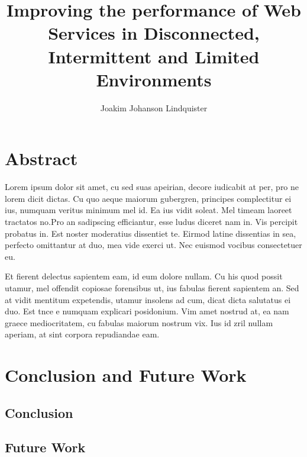\documentclass[USenglish]{ifimaster}
\title{Improving the performance of Web Services in Disconnected, Intermittent
and Limited Environments}
\author{Joakim Johanson Lindquister}
\begin{document}
\ififorside{}

\chapter*{Abstract}

Lorem ipsum dolor sit amet, cu sed suas apeirian, decore iudicabit at per, pro
ne lorem dicit dictas. Cu quo aeque maiorum gubergren, principes complectitur ei
ius, numquam veritus minimum mel id. Ea ius vidit soleat. Mel timeam laoreet
tractatos no.Pro an sadipscing efficiantur, esse ludus diceret nam in. Vis
percipit probatus in. Est noster moderatius dissentiet te. Eirmod latine
dissentias in sea, perfecto omittantur at duo, mea vide exerci ut. Nec euismod
vocibus consectetuer eu.

Et fierent delectus sapientem eam, id eum dolore nullam. Cu his quod possit
utamur, mel offendit copiosae forensibus ut, ius fabulas fierent sapientem an.
Sed at vidit mentitum expetendis, utamur insolens ad cum, dicat dicta salutatus
ei duo. Est tnce e numquam explicari posidonium. Vim amet nostrud at, ea nam graece
mediocritatem, cu fabulas maiorum nostrum vix. Ius id zril nullam aperiam, at
sint corpora repudiandae eam.

\tableofcontents
\listoftables
\listoffigures

\pagebreak








\chapter{Conclusion and Future Work}
\section{Conclusion}

\section{Future Work}

\pagebreak
\printbibliography{}
\printglossaries{}


\end{document}
